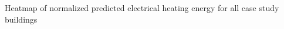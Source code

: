 Heatmap of normalized predicted electrical heating energy for all case study buildings
\label{fig:heating_heatmap}